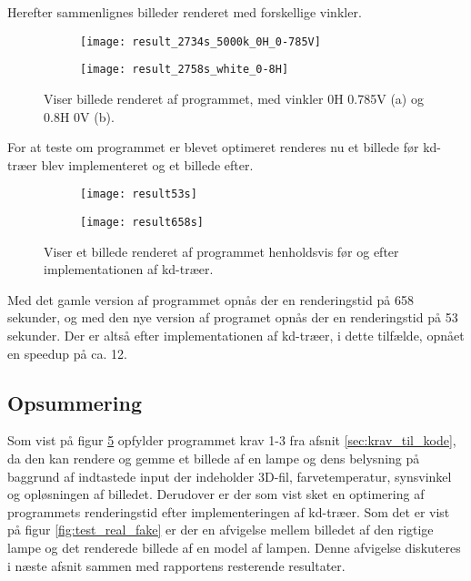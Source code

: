Herefter sammenlignes billeder renderet med forskellige vinkler.
\begin{figure}[H]
\centering
\begin{subfigure}{.5\textwidth}
  \centering
  \texttt{[image: result\_2734s\_5000k\_0H\_0-785V]}
  \caption{}
  \label{fig:real}
\end{subfigure}%
\begin{subfigure}{.5\textwidth}
  \centering
  \texttt{[image: result\_2758s\_white\_0-8H]}
  \caption{}
  \label{fig:fake}
\end{subfigure}
\caption{Viser billede renderet af programmet, med vinkler 0H 0.785V (a) og 0.8H 0V (b).}
\label{fig:synsvinkel1}
\end{figure}

For at teste om programmet er blevet optimeret renderes nu et billede før kd-træer blev implementeret og et billede efter.
\begin{figure}[H]
\centering
\begin{subfigure}{.5\textwidth}
  \centering
  \texttt{[image: result53s]}
  \caption{}
  \label{fig:real}
\end{subfigure}
\begin{subfigure}{.5\textwidth}
  \centering
  \texttt{[image: result658s]}
  \caption{}
  \label{fig:fake}
\end{subfigure}
\caption{Viser et billede renderet af programmet henholdsvis før og efter implementationen af kd-træer.}
\label{fig:synsvinkel1}
\end{figure}

Med det gamle version af programmet opnås der en renderingstid på 658 sekunder, og med den nye version af programet opnås der en renderingstid på 53 sekunder. Der er altså efter implementationen af kd-træer, i dette tilfælde, opnået en speedup på ca. 12.

\subsection*{Opsummering}
Som vist på figur \ref{fig:fake} opfylder programmet krav 1-3 fra afsnit \ref{sec:krav_til_kode}, da den kan rendere og gemme et billede af en lampe og dens belysning på baggrund af indtastede input der indeholder 3D-fil, farvetemperatur, synsvinkel og opløsningen af billedet. Derudover er der som vist sket en optimering af programmets renderingstid efter implementeringen af kd-træer. 
Som det er vist på figur \ref{fig:test_real_fake} er der en afvigelse mellem billedet af den rigtige lampe og det renderede billede af en model af lampen. Denne afvigelse diskuteres i næste afsnit sammen med rapportens resterende resultater. 

